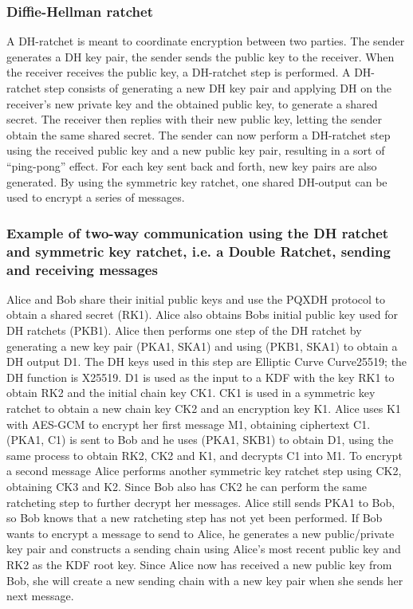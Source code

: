 \subsubsection{Diffie-Hellman ratchet}

A DH-ratchet is meant to coordinate encryption between two parties.
The sender generates a DH key pair, the sender sends the public key to the receiver.
When the receiver receives the public key, a DH-ratchet step is performed.
A DH-ratchet step consists of generating a new DH key pair and applying DH on the receiver's new private key and the obtained public key, to generate a shared secret.
The receiver then replies with their new public key, letting the sender obtain the same shared secret.
The sender can now perform a DH-ratchet step using the received public key and a new public key pair, resulting in a sort of “ping-pong” effect.
For each key sent back and forth, new key pairs are also generated. By using the symmetric key ratchet, one shared DH-output can be used to encrypt a series of messages. \cite{ref19} 

 

\subsubsection{Example of two-way communication using the DH ratchet and symmetric key ratchet, i.e. a Double Ratchet, sending and receiving messages}

Alice and Bob share their initial public keys and use the PQXDH protocol to obtain a shared secret (RK1).
Alice also obtains Bobs initial public key used for DH ratchets (PKB1).
Alice then performs one step of the DH ratchet by generating a new key pair (PKA1, SKA1) and using (PKB1, SKA1) to obtain a DH output D1.
The DH keys used in this step are Elliptic Curve Curve25519; the DH function is X25519.
D1 is used as the input to a KDF with the key RK1 to obtain RK2 and the initial chain key CK1.
CK1 is used in a symmetric key ratchet to obtain a new chain key CK2 and an encryption key K1.
Alice uses K1 with AES-GCM to encrypt her first message M1, obtaining ciphertext C1.
(PKA1, C1) is sent to Bob and he uses (PKA1, SKB1) to obtain D1, using the same process to obtain RK2, CK2 and K1, and decrypts C1 into M1.
To encrypt a second message Alice performs another symmetric key ratchet step using CK2, obtaining CK3 and K2.
Since Bob also has CK2 he can perform the same ratcheting step to further decrypt her messages.
Alice still sends PKA1 to Bob, so Bob knows that a new ratcheting step has not yet been performed.
If Bob wants to encrypt a message to send to Alice, he generates a new public/private key pair and constructs a sending chain using Alice’s most recent public key and RK2 as the KDF root key.
Since Alice now has received a new public key from Bob, she will create a new sending chain with a new key pair when she sends her next message. 

